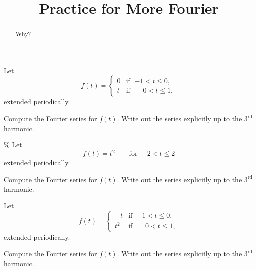 \documentclass{ximera}
\title{Practice for More Fourier}
\begin{document}
\begin{abstract}
Why?
\end{abstract}
\maketitle


\begin{exercise}
    Let
    \begin{equation*}
        f(t) =
        \begin{cases}
            0 & \text{if } \; {-1} < t \leq 0 , \\
            t & \text{if } \; \phantom{-}0 < t \leq  1 ,
        \end{cases}
    \end{equation*}
    extended periodically.
    \begin{tasks}
        \task Compute the Fourier series for $f(t)$.
        \task Write out the series explicitly up to the $3^{\text{rd}}$ harmonic.
    \end{tasks}
\end{exercise}

\begin{exercise}\%
    Let
    \begin{equation*}
        f(t) = t^2 \qquad \text{for } \; {-2} < t \leq 2
    \end{equation*}
    extended periodically.
    \begin{tasks}
        \task Compute the Fourier series for $f(t)$.
        \task Write out the series explicitly up to the $3^{\text{rd}}$ harmonic.
    \end{tasks}
\end{exercise}

\begin{exercise}
    Let
    \begin{equation*}
        f(t) =
        \begin{cases}
            -t & \text{if } \; {-1} < t \leq 0 , \\
            t^2 & \text{if } \; \phantom{-}0 < t \leq  1 ,
        \end{cases}
    \end{equation*}
    extended periodically.
    \begin{tasks}
        \task Compute the Fourier series for $f(t)$.
        \task Write out the series explicitly up to the $3^{\text{rd}}$ harmonic.
    \end{tasks}
\end{exercise}
\end{document}
